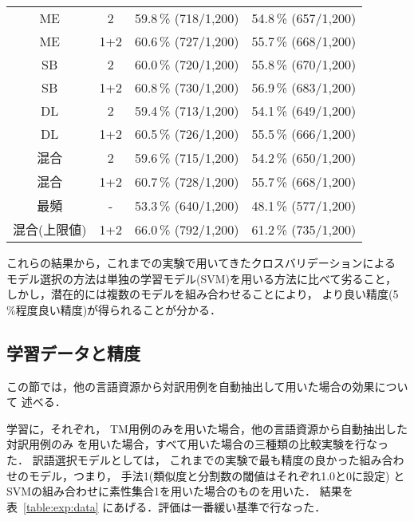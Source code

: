 \begin{table}[htbp]
\begin{center}
\begin{tabular}[c]{|c|c|r|r|}
      ME  & 2   & 59.8\,\% (718/1,200) & 54.8\,\% (657/1,200)\\
      ME  & 1+2 & 60.6\,\% (727/1,200) & 55.7\,\% (668/1,200)\\
      SB  & 2   & 60.0\,\% (720/1,200) & 55.8\,\% (670/1,200)\\
      SB  & 1+2 & 60.8\,\% (730/1,200) & 56.9\,\% (683/1,200)\\
      DL  & 2   & 59.4\,\% (713/1,200) & 54.1\,\% (649/1,200)\\
      DL  & 1+2 & 60.5\,\% (726/1,200) & 55.5\,\% (666/1,200)\\
      混合 & 2   & 59.6\,\% (715/1,200) & 54.2\,\% (650/1,200) \\
      混合 & 1+2 & 60.7\,\% (728/1,200) & 55.7\,\% (668/1,200) \\
      最頻 & - & 53.3\,\% (640/1,200) & 48.1\,\% (577/1,200) \\
      \hline
      混合(上限値) & 1+2 & 66.0\,\% (792/1,200) & 61.2\,\% (735/1,200) \\
      \hline
    \end{tabular}
  \end{center}
\end{table}

これらの結果から，これまでの実験で用いてきたクロスバリデーションによる
モデル選択の方法は単独の学習モデル(SVM)を用いる方法に比べて劣ること，
しかし，潜在的には複数のモデルを組み合わせることにより，
より良い精度(5\,\%程度良い精度)が得られることが分かる．

\subsection{学習データと精度}
\label{sec:data_and_accuracy}

この節では，他の言語資源から対訳用例を自動抽出して用いた場合の効果について
述べる．

学習に，それぞれ，
TM用例のみを用いた場合，他の言語資源から自動抽出した対訳用例のみ
を用いた場合，すべて用いた場合の三種類の比較実験を行なった．
訳語選択モデルとしては，
これまでの実験で最も精度の良かった組み合わせのモデル，つまり，
手法1(類似度と分割数の閾値はそれぞれ1.0と0に設定)
とSVMの組み合わせに素性集合1を用いた場合のものを用いた．
結果を表~\ref{table:exp:data} にあげる．評価は一番緩い基準で行なった．


